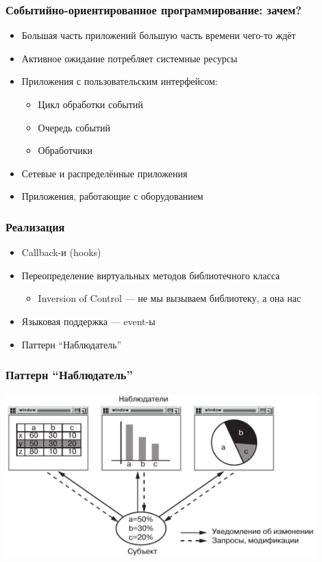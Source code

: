 \documentclass{../../slides-style}
\begin{document}
    \begin{frame}[plain]
        \titlepage
    \end{frame}

    \begin{frame}
        \frametitle{Событийно-ориентированное программирование: зачем?}
        \begin{itemize}
            \item Большая часть приложений большую часть времени чего-то ждёт
            \item Активное ожидание потребляет системные ресурсы
            \item Приложения с пользовательским интерфейсом:
            \begin{itemize}
                \item Цикл обработки событий
                \item Очередь событий
                \item Обработчики
            \end{itemize}
            \item Сетевые и распределённые приложения
            \item Приложения, работающие с оборудованием
        \end{itemize}
    \end{frame}

    \begin{frame}
        \frametitle{Реализация}
        \begin{itemize}
            \item Callback-и (hooks)
            \item Переопределение виртуальных методов библиотечного класса
            \begin{itemize}
                \item Inversion of Control --- не мы вызываем библиотеку, а она нас
            \end{itemize}
            \item Языковая поддержка --- event-ы
            \item Паттерн \enquote{Наблюдатель}
        \end{itemize}
    \end{frame}

    \begin{frame}
        \frametitle{Паттерн \enquote{Наблюдатель}}
        \begin{center}
            \includegraphics[width=0.9\textwidth]{observerExample.png}
        \end{center}
    \end{frame}
\end{document}
